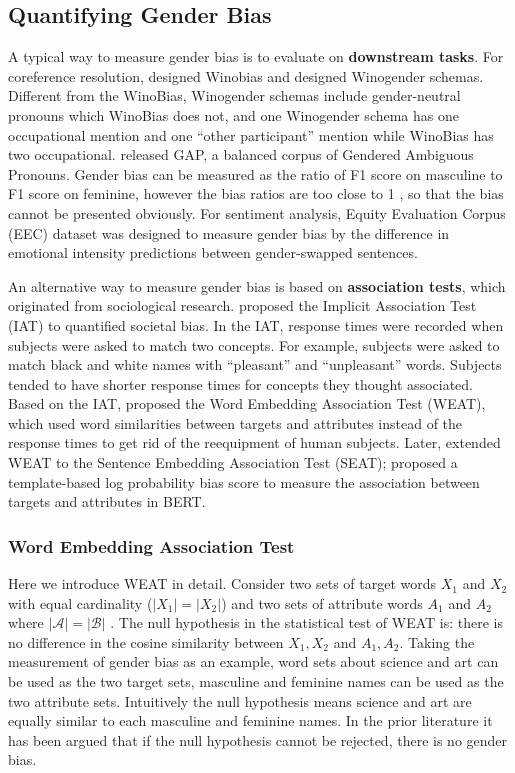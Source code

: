 \subsection{Quantifying Gender Bias}
A typical way to measure gender bias is to evaluate on \textbf{downstream tasks}. For coreference resolution, \citet{zhao2018gender} designed Winobias and \citet{rudinger2018gender} designed Winogender schemas. Different from the WinoBias, Winogender schemas include gender-neutral pronouns which WinoBias does not, and one Winogender schema has one occupational mention and one “other participant” mention while WinoBias has two occupational. \citet{webster2018mind} released GAP, a balanced corpus of Gendered Ambiguous Pronouns. Gender bias can be measured as the ratio of F1 score on masculine to F1 score on feminine, however the bias ratios are too close to 1 \citep{Chada_2019, Attree_2019}, so that the bias cannot be presented obviously. For sentiment analysis, Equity Evaluation Corpus (EEC) dataset \citep{Kiritchenko_2018} was designed to measure gender bias by the difference in emotional intensity predictions between gender-swapped sentences.

An alternative way to measure gender bias is based on \textbf{association tests}, which originated from sociological research. \citet{greenwald1998measuring} proposed the Implicit Association Test (IAT) to quantified societal bias. In the IAT, response times were recorded when subjects were asked to match two concepts. For example, subjects were asked to match black and white names with “pleasant” and “unpleasant” words. Subjects tended to have shorter response times for concepts they thought associated. Based on the IAT, \citet{caliskan2017semantics} proposed the Word Embedding Association Test (WEAT), which used word similarities between targets and attributes instead of the response times to get rid of the reequipment of human subjects. Later, \citet{may2019measuring} extended WEAT to the Sentence Embedding Association Test (SEAT); \citet{kurita2019measuring} proposed a template-based log probability bias score to measure the association between targets and attributes in BERT.

\subsubsection{Word Embedding Association Test}
Here we introduce WEAT in detail. Consider two sets of target words $X_1$ and $X_2$ with equal cardinality ($|X_1|=|X_2|$) and two sets of attribute words $A_1$ and $A_2$ where $|\mathcal{A}|=|\mathcal{B}|$ . The null hypothesis in the statistical test of WEAT is: there is no difference in the cosine similarity between $X_1,X_2$ and $
A_1,A_2$. Taking the measurement of gender bias as an example, word sets about science and art can be used as the two target sets, masculine and feminine names can be used as the two attribute sets. Intuitively the null hypothesis means science and art are equally similar to each masculine and feminine names. In the prior literature it has been argued that if the null hypothesis cannot be rejected, there is no gender bias. 

